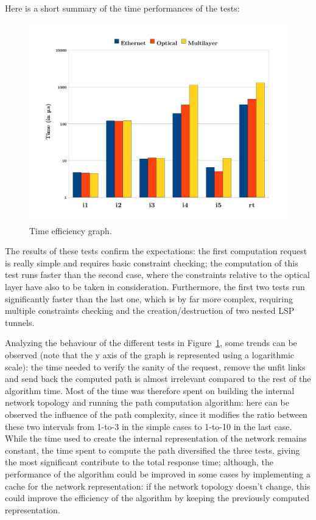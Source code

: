 \documentclass[10pt,a4paper]{report}
\begin{document}
Here is a short summary of the time performances of the tests:
\begin{figure}[!htbp]
  \begin{center}
    \includegraphics[width=1\textwidth]{img/time_graph}
    \caption[Time efficiency graph]{Time efficiency graph.}
    \label{fig:time_graph}
  \end{center}
\end{figure}

The results of these tests confirm the expectations: the first
computation request is really simple and requires basic constraint
checking; the computation of this test runs faster than the second
case, where the constraints relative to the optical layer have also to
be taken in consideration. Furthermore, the first two tests run
significantly faster than the last one, which is by far more complex,
requiring multiple constraints checking and the creation/destruction
of two nested LSP tunnels. 

Analyzing the behaviour of the different tests in
Figure~\ref{fig:time_graph}, some trends can be observed (note that
the y axis of the graph is represented using a logarithmic scale): the
time needed to verify the sanity of the request, remove the unfit
links and send back the computed path is almost irrelevant compared to
the rest of the algorithm time. Most of the time was therefore spent
on building the internal network topology and running the path
computation algorithm: here can be observed the influence of the path
complexity, since it modifies the ratio between these two intervals
from 1-to-3 in the simple cases to 1-to-10 in the last case. While the
time used to create the internal representation of the network remains
constant, the time spent to compute the path diversified the three
tests, giving the most significant contribute to the total response
time; although, the performance of the algorithm could be improved in
some cases by implementing a cache for the network representation: if
the network topology doesn't change, this could improve the efficiency
of the algorithm by keeping the previously computed representation.
\end{document}
